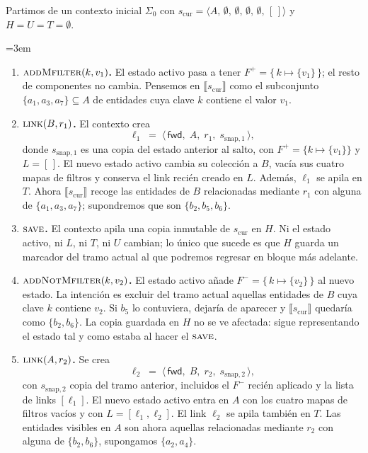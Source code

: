 Partimos de un contexto inicial $\Sigma_{0}$ con
$s_{\text{cur}} = \langle A,\, \emptyset,\, \emptyset,\, \emptyset,\, \emptyset,\, [\,] \rangle$ y
$H = U = T = \emptyset$.

\begingroup
\emergencystretch=3em
\begin{enumerate}
  \item \textbf{$\textsc{addMfilter}(k, v_{1})$.}
    El estado activo pasa a tener $F^{+} = \{\, k \mapsto \{v_{1}\} \,\}$; el resto de componentes no
    cambia. Pensemos en $\llbracket s_{\text{cur}} \rrbracket$ como el subconjunto
    $\{a_{1}, a_{3}, a_{7}\} \subseteq A$ de entidades cuya clave $k$ contiene el valor $v_{1}$.

  \item \textbf{$\textsc{link}(B, r_{1})$.}
    El contexto crea
    \[
      \ell_{1} \;=\; \langle\, \mathsf{fwd},\; A,\; r_{1},\; s_{\text{snap},1} \,\rangle,
    \]
    donde $s_{\text{snap},1}$ es una copia del estado anterior al salto, con $F^{+} = \{k \mapsto \{v_{1}\}\}$
    y $L = [\,]$. El nuevo estado activo cambia su colección a $B$, vacía sus cuatro mapas de filtros y
    conserva el link recién creado en $L$. Además, $\ell_{1}$ se apila en $T$. Ahora
    $\llbracket s_{\text{cur}} \rrbracket$ recoge las entidades de $B$ relacionadas mediante $r_{1}$ con
    alguna de $\{a_{1}, a_{3}, a_{7}\}$; supondremos que son $\{b_{2}, b_{5}, b_{6}\}$.

  \item \textbf{$\textsc{save}$.}
    El contexto apila una copia inmutable de $s_{\text{cur}}$ en $H$. Ni el estado activo, ni $L$, ni $T$,
    ni $U$ cambian; lo único que sucede es que $H$ guarda un marcador del tramo actual al que podremos
    regresar en bloque más adelante.

  \item \textbf{$\textsc{addNotMfilter}(k, v_{2})$.}
    El estado activo añade $F^{-} = \{\, k \mapsto \{v_{2}\} \,\}$ al nuevo estado. La intención es
    excluir del tramo actual aquellas entidades de $B$ cuya clave $k$ contiene $v_{2}$. Si $b_{5}$ lo
    contuviera, dejaría de aparecer y $\llbracket s_{\text{cur}} \rrbracket$ quedaría como
    $\{b_{2}, b_{6}\}$. La copia guardada en $H$ no se ve afectada: sigue representando el estado tal y
    como estaba al hacer el $\textsc{save}$.

  \item \textbf{$\textsc{link}(A, r_{2})$.}
    Se crea
    \[
      \ell_{2} \;=\; \langle\, \mathsf{fwd},\; B,\; r_{2},\; s_{\text{snap},2} \,\rangle,
    \]
    con $s_{\text{snap},2}$ copia del tramo anterior, incluidos el $F^{-}$ recién aplicado y la lista de
    links $[\ell_{1}]$. El nuevo estado activo entra en $A$ con los cuatro mapas de filtros vacíos y con
    $L = [\ell_{1}, \ell_{2}]$. El link $\ell_{2}$ se apila también en $T$. Las entidades visibles en $A$ 
    son ahora aquellas relacionadas mediante $r_{2}$ con alguna de $\{b_{2}, b_{6}\}$, supongamos $\{a_{2}, a_{4}\}$.


\end{enumerate}
